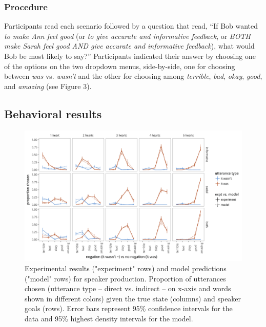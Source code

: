 \documentclass[10pt, letterpaper]{article}
\newenvironment{CodeChunk}{}{}
\begin{document}
\subsubsection{Procedure}\label{procedure}

Participants read each scenario followed by a question that read, ``If
Bob wanted \emph{to make Ann feel good} (or \emph{to give accurate and
informative feedback}, or \emph{BOTH make Sarah feel good AND give
accurate and informative feedback}), what would Bob be most likely to
say?'' Participants indicated their answer by choosing one of the
options on the two dropdown menus, side-by-side, one for choosing
between \emph{was} vs. \emph{wasn't} and the other for choosing among
\emph{terrible}, \emph{bad}, \emph{okay}, \emph{good}, and
\emph{amazing} (see Figure 3).

\subsection{Behavioral results}\label{behavioral-results}

\begin{CodeChunk}
\begin{figure}[t]

{\centering \includegraphics{figs/expt2_results-1} 

}

\caption[Experimental results ("experiment" rows) and model predictions ("model" rows) for speaker production]{Experimental results ("experiment" rows) and model predictions ("model" rows) for speaker production. Proportion of utterances chosen (utterance type -- direct vs. indirect -- on x-axis and words shown in different colors) given the true state (columns) and speaker goals (rows). Error bars represent 95\% confidence intervals for the data and 95\% highest density intervals for the model.}\label{fig:expt2_results}
\end{figure}
\end{CodeChunk}
\end{document}
